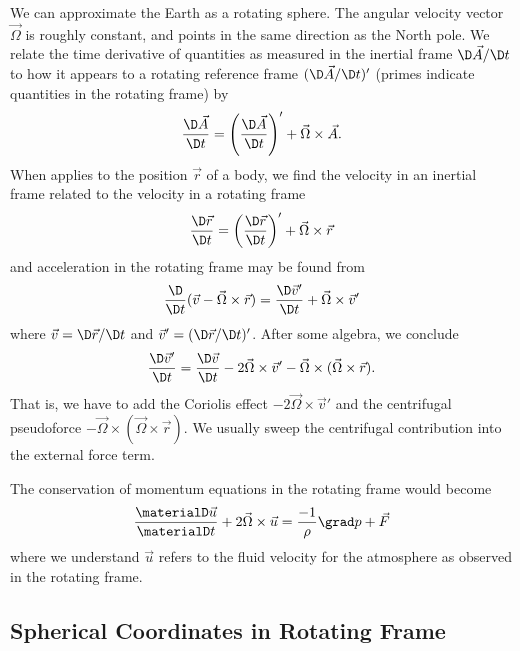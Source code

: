 We can approximate the Earth as a rotating sphere. The angular velocity
vector $\vec{\Omega}$ is roughly constant, and points in the same
direction as the North pole. We relate the time derivative of quantities
as measured in the inertial frame $\D\vec{A}/\D t$ to how it appears to a
rotating reference frame $(\D\vec{A}/\D t)'$ (primes indicate quantities
in the rotating frame) by
\begin{equation}
  \frac{\D\vec{A}}{\D t} = \left(\frac{\D\vec{A}}{\D t}\right)' + \vec{\Omega}\times\vec{A}.
\end{equation}
When applies to the position $\vec{r}$ of a body, we find the velocity
in an inertial frame related to the velocity in a rotating frame
\begin{equation}
  \frac{\D\vec{r}}{\D t} = \left(\frac{\D\vec{r}}{\D t}\right)' + \vec{\Omega}\times\vec{r}
\end{equation}
and acceleration in the rotating frame may be found from
\begin{equation}
  \frac{\D}{\D t}(\vec{v} - \vec{\Omega}\times\vec{r})
  = \frac{\D\vec{v}'}{\D t}+\vec{\Omega}\times\vec{v}'
\end{equation}
where $\vec{v} = \D\vec{r}/\D t$ and $\vec{v}' = (\D\vec{r}/\D t)'$.
After some algebra, we conclude
\begin{equation}
  \frac{\D\vec{v}'}{\D t}
  = \frac{\D \vec{v}}{\D t}
    - 2\vec{\Omega}\times\vec{v}'
    - \vec{\Omega}\times(\vec{\Omega}\times\vec{r}).
\end{equation}
That is, we have to add the Coriolis effect
$-2\vec{\Omega}\times\vec{v}'$ and the centrifugal pseudoforce
$-\vec{\Omega}\times(\vec{\Omega}\times\vec{r})$. We usually sweep the
centrifugal contribution into the external force term.

The conservation of momentum equations in the rotating frame would
become
\begin{equation}
  \frac{\materialD\vec{u}}{\materialD t} + 2\vec{\Omega}\times\vec{u}
  = \frac{-1}{\rho}\grad p + \vec{F}
\end{equation}
where we understand $\vec{u}$ refers to the fluid velocity for the
atmosphere as observed in the rotating frame.

\subsection{Spherical Coordinates in Rotating Frame}

